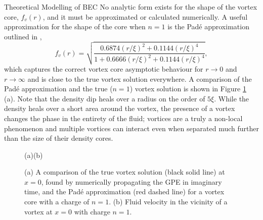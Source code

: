 \begin{chapter}{\label{cha:theoretical_model}Theoretical Modelling of BEC}
No analytic form exists for the shape of the vortex core, $f_v(r)$, and it must be approximated or calculated numerically. A useful approximation for the shape of the core when $n=1$ is the Pad\'e approximation outlined in \cite{berloff2004},
	\begin{equation}
		f_v(r) = \sqrt{\frac{0.6874(r/\xi)^2 + 0.1144(r/\xi)^4}{1+0.6666(r/\xi)^2+0.1144(r/\xi)^4}},
	\end{equation}
which captures the correct vortex core asymptotic behaviour for $r\rightarrow 0$ and $r\rightarrow\infty$ and is close to the true vortex solution everywhere. A comparison of the Pad\'e approximation and the true ($n=1$) vortex solution is shown in Figure \ref{fig_vortex} (a). Note that the density dip heals over a radius on the order of $5\xi$. While the density heals over a short area around the vortex, the presence of a vortex changes the phase in the entirety of the fluid; vortices are a truly a non-local phenomenon and multiple vortices can interact even when separated much further than the size of their density cores.

\begin{figure}
	\hspace{-0.13\linewidth}(a)\hspace{0.45\linewidth}(b)\hspace{0.03\linewidth}\\
	\centering
  \caption{(a) A comparison of the true vortex solution (black solid line) at $x=0$, found by numerically propagating the GPE in imaginary time, and the Pad\'e approximation (red dashed line) for a vortex core with a charge of $n=1$. (b) Fluid velocity in the vicinity of a vortex at $x=0$ with charge $n=1$.}\label{fig_vortex}
 \end{figure}


\end{chapter}
